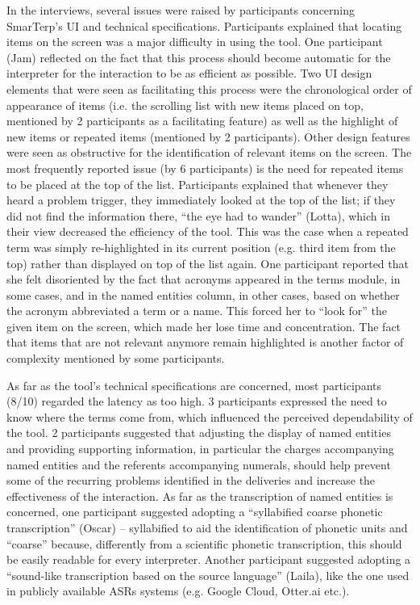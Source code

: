 \begin{sloppypar}
In the interviews, several issues were raised by participants concerning SmarTerp’s UI and technical specifications. Participants explained that locating items on the screen was a major difficulty in using the tool. One participant (Jam) reflected on the fact that this process should become automatic for the interpreter for the interaction to be as efficient as possible. Two UI design elements that were seen as facilitating this process were the chronological order of appearance of items (i.e. the scrolling list with new items placed on top, mentioned by 2 participants as a facilitating feature) as well as the highlight of new items or repeated items (mentioned by 2 participants). Other design features were seen as obstructive for the identification of relevant items on the screen. The most frequently reported issue (by 6 participants) is the need for repeated items to be placed at the top of the list. Participants explained that whenever they heard a problem trigger, they immediately looked at the top of the list; if they did not find the information there, ``the eye had to wander'' (Lotta), which in their view decreased the efficiency of the tool. This was the case when a repeated term was simply re-highlighted in its current position (e.g. third item from the top) rather than displayed on top of the list again. One participant reported that she felt disoriented by the fact that acronyms appeared in the terms module, in some cases, and in the named entities column, in other cases, based on whether the acronym abbreviated a term or a name. This forced her to ``look for'' the given item on the screen, which made her lose time and concentration. The fact that items that are not relevant anymore remain highlighted is another factor of complexity mentioned by some participants.
\end{sloppypar}

As far as the tool’s technical specifications are concerned, most participants (8/10) regarded the latency as too high. 3 participants expressed the need to know where the terms come from, which influenced the perceived dependability of the tool. 2 participants suggested that adjusting the display of named entities and providing supporting information, in particular the charges accompanying named entities and the referents accompanying numerals, should help prevent some of the recurring problems identified in the deliveries and increase the effectiveness of the interaction. As far as the transcription of named entities is concerned, one participant suggested adopting a ``syllabified coarse phonetic transcription'' (Oscar)  --  syllabified to aid the identification of phonetic units and ``coarse'' because, differently from a scientific phonetic transcription, this should be easily readable for every interpreter. Another participant suggested adopting a ``sound-like transcription based on the source language'' (Laila), like the one used in publicly available ASRs systems (e.g. Google Cloud, Otter.ai etc.).

